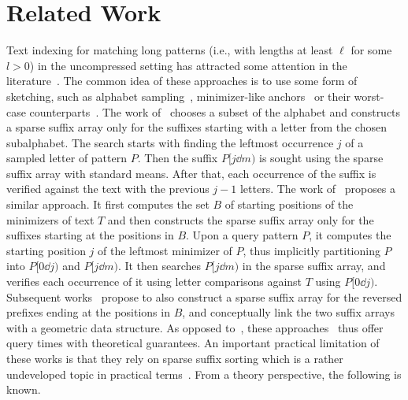 \section{Related Work} \label{sec:related}

Text indexing for matching long patterns (i.e., with lengths at least $\ell$ for some $l > 0$) in the uncompressed setting
has attracted some attention in the literature~\cite{DBLP:journals/jda/ClaudeNPST12,DBLP:journals/spe/GrabowskiR17,DBLP:conf/esa/LoukidesP21,DBLP:journals/tkde/LoukidesPS23,DBLP:journals/pvldb/AyadLP23,DBLP:journals/corr/abs-2407-11819}. The common idea of these approaches is to use some form of sketching, such as alphabet sampling~\cite{DBLP:journals/jda/ClaudeNPST12}, minimizer-like anchors~\cite{DBLP:journals/spe/GrabowskiR17,DBLP:conf/esa/LoukidesP21,DBLP:journals/tkde/LoukidesPS23,DBLP:journals/pvldb/AyadLP23} or their worst-case counterparts~\cite{DBLP:journals/corr/abs-2407-11819}. The work of~\cite{DBLP:journals/jda/ClaudeNPST12} chooses a subset of the alphabet and constructs a sparse suffix array only for the suffixes starting with a letter from the chosen 
subalphabet. The search starts with finding the leftmost occurrence $j$ of a sampled letter of 
pattern $P$. Then the suffix $P[j\dd m)$ is sought
using the sparse suffix array with standard means. After that, each occurrence of
the suffix is verified against the text with the previous $j - 1$ letters.
The work of~\cite{DBLP:journals/spe/GrabowskiR17} proposes a similar approach. It first computes the set $B$ of starting positions of the minimizers of text $T$
and then constructs the sparse suffix array only for the suffixes starting at the positions in $B$.
Upon a query pattern $P$, it computes the starting position $j$ of the leftmost minimizer of $P$,
thus implicitly partitioning $P$ into $P[0\dd j)$ and $P[j\dd m)$. It then searches
$P[j\dd m)$ in the sparse suffix array, and verifies each occurrence of it using letter comparisons
against $T$ using $P[0\dd j)$. Subsequent works~\cite{DBLP:conf/esa/LoukidesP21,DBLP:journals/tkde/LoukidesPS23,DBLP:journals/pvldb/AyadLP23} propose to also construct a sparse suffix array for the reversed prefixes
ending at the positions in $B$, and conceptually link the two suffix arrays with a geometric data structure.
As opposed to~\cite{DBLP:journals/jda/ClaudeNPST12,DBLP:journals/spe/GrabowskiR17}, these approaches~\cite{DBLP:conf/esa/LoukidesP21,DBLP:journals/tkde/LoukidesPS23,DBLP:journals/pvldb/AyadLP23} thus offer query times with theoretical guarantees. An important practical limitation of these works is that they rely on sparse suffix sorting which is a rather undeveloped topic in practical terms~\cite{DBLP:conf/latin/AyadLPV24}.
From a theory perspective, the following is known.

